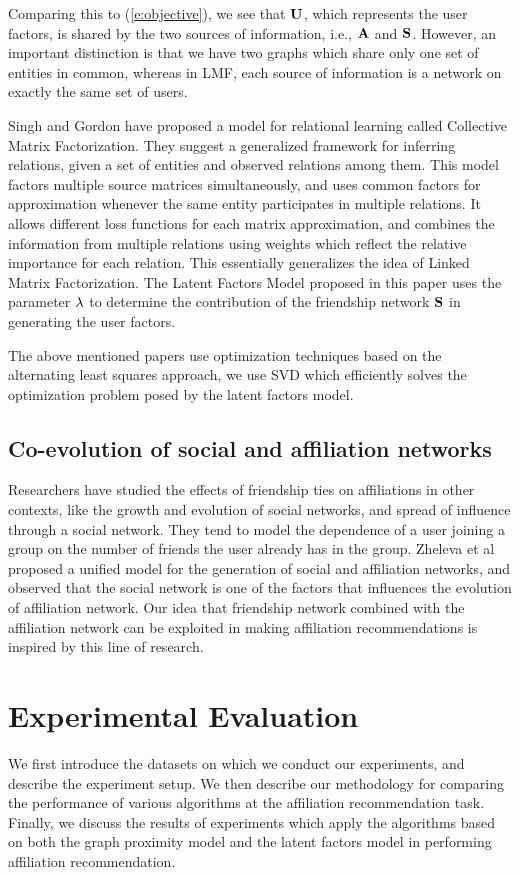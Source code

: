 \documentclass{sig-alternate}
\begin{document}
Comparing this to (\ref{e:objective}), we see that $\mathbf{U}$, which represents the user factors, is shared by the two sources of information, i.e., $\mathbf{A}$ and $\mathbf{S}$. However, an important distinction is that we have two graphs which share only one set of entities in common, whereas in LMF, each source of information is a network on exactly the same set of users.

Singh and Gordon have proposed a model for relational learning called Collective Matrix Factorization\cite{SinghCMF}. They suggest a generalized framework for inferring relations, given a set of entities and observed relations among them. This model factors multiple source matrices simultaneously, and uses common factors for approximation whenever the same entity participates in multiple relations. It allows different loss functions for each matrix approximation, and combines the information from multiple relations using weights which reflect the relative importance for each relation. This essentially generalizes the idea of Linked Matrix Factorization. The Latent Factors Model proposed in this paper uses the parameter $\lambda$ to determine the contribution of the friendship network $\mathbf{S}$ in generating the user factors.

The above mentioned papers use optimization techniques based on the alternating least squares approach, we use SVD which efficiently solves the optimization problem posed by the latent factors model.

\subsection{Co-evolution of social and affiliation networks}
Researchers have studied the effects of friendship ties on affiliations in other contexts, like the growth and evolution of social networks\cite{GroupFormation}, and spread of influence through a social network\cite{KleinbergInfluence, ChenInfMax}. They tend to model the dependence of a user joining a group on the number of friends the user already has in the group. Zheleva et al\cite{Coevolution} proposed a unified model for the generation of social and affiliation networks, and observed that the social network is one of the factors that influences the evolution of affiliation network. Our idea that friendship network combined with the affiliation network can be exploited in making affiliation recommendations is inspired by this line of research.

\section{Experimental Evaluation}
\label{Experimental Evaluation}
We first introduce the datasets on which we conduct our experiments, and describe the experiment setup. We then describe our methodology for comparing the performance of various algorithms at the affiliation recommendation task. Finally, we discuss the results of experiments which apply the algorithms based on both the graph proximity model and the latent factors model in performing affiliation recommendation.
\end{document}
